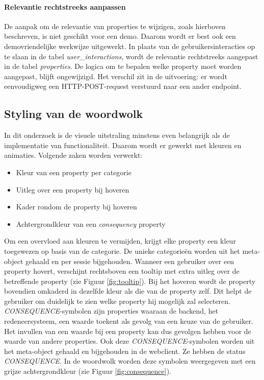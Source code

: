 \paragraph{Relevantie rechtstreeks aanpassen}
De aanpak om de relevantie van properties te wijzigen, zoals hierboven beschreven, is niet geschikt voor een demo. Daarom wordt er best ook een demovriendelijke werkwijze uitgewerkt. In plaats van de gebruikersinteracties op te slaan in de tabel \textit{user\_interactions}, wordt de relevantie rechtstreeks aangepast in de tabel \textit{properties}. De logica om te bepalen welke property moet worden aangepast, blijft ongewijzigd. Het verschil zit in de uitvoering: er wordt eenvoudigweg een HTTP-POST-request verstuurd naar een ander endpoint.

\subsection{Styling van de woordwolk}
In dit onderzoek is de visuele uitstraling minstens even belangrijk als de implementatie van functionaliteit. Daarom wordt er gewerkt met kleuren en animaties. Volgende zaken worden verwerkt:
\begin{itemize}
    \item {Kleur van een property per categorie}
    \item {Uitleg over een property bij hoveren}
    \item {Kader rondom de property bij hoveren}
    \item {Achtergrondkleur van een \textit{consequency} property}
\end{itemize}
Om een overvloed aan kleuren te vermijden, krijgt elke property een kleur toegewezen op basis van de categorie. De unieke categorieën worden uit het meta-object gehaald en per sessie bijgehouden. Wanneer een gebruiker over een property hovert, verschijnt rechtsboven een tooltip met extra uitleg over de betreffende property (zie Figuur \ref{fig:tooltip}). Bij het hoveren wordt de property bovendien omkaderd in dezelfde kleur als die van de property zelf. Dit helpt de gebruiker om duidelijk te zien welke property hij mogelijk zal selecteren. \textit{CONSEQUENCE}-symbolen zijn properties waaraan de backend, het redeneersysteem, een waarde toekent als gevolg van een keuze van de gebruiker. Het invullen van een waarde bij een property kan dus gevolgen hebben voor de waarde van andere properties. Ook deze \textit{CONSEQUENCE}-symbolen worden uit het meta-object gehaald en bijgehouden in de webclient. Ze hebben de status \textit{CONSEQUENCE}. In de woordwolk worden deze symbolen weergegeven met een grijze achtergrondkleur (zie Figuur \ref{fig:consequence}).
